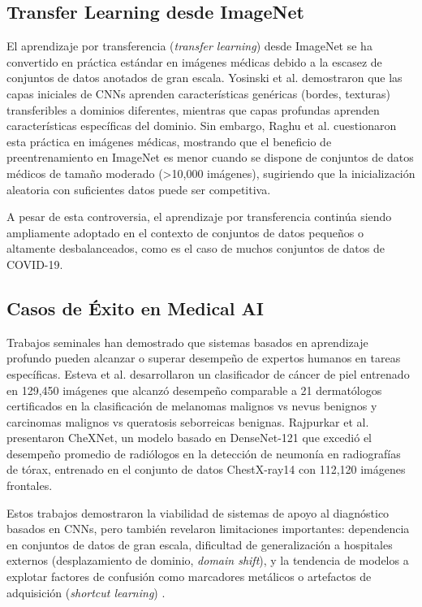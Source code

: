 \subsection{Transfer Learning desde ImageNet}

El aprendizaje por transferencia (\textit{transfer learning}) desde ImageNet \cite{deng2009imagenet} se ha convertido en práctica estándar en imágenes médicas debido a la escasez de conjuntos de datos anotados de gran escala. Yosinski et al. \cite{yosinski2014transferable} demostraron que las capas iniciales de CNNs aprenden características genéricas (bordes, texturas) transferibles a dominios diferentes, mientras que capas profundas aprenden características específicas del dominio. Sin embargo, Raghu et al. \cite{raghu2019transfusion} cuestionaron esta práctica en imágenes médicas, mostrando que el beneficio de preentrenamiento en ImageNet es menor cuando se dispone de conjuntos de datos médicos de tamaño moderado (\textgreater10,000 imágenes), sugiriendo que la inicialización aleatoria con suficientes datos puede ser competitiva.

A pesar de esta controversia, el aprendizaje por transferencia continúa siendo ampliamente adoptado en el contexto de conjuntos de datos pequeños o altamente desbalanceados, como es el caso de muchos conjuntos de datos de COVID-19.

\subsection{Casos de Éxito en Medical AI}

Trabajos seminales han demostrado que sistemas basados en aprendizaje profundo pueden alcanzar o superar desempeño de expertos humanos en tareas específicas. Esteva et al. \cite{esteva2017dermatologist} desarrollaron un clasificador de cáncer de piel entrenado en 129,450 imágenes que alcanzó desempeño comparable a 21 dermatólogos certificados en la clasificación de melanomas malignos vs nevus benignos y carcinomas malignos vs queratosis seborreicas benignas. Rajpurkar et al. \cite{rajpurkar2017chexnet} presentaron CheXNet, un modelo basado en DenseNet-121 que excedió el desempeño promedio de radiólogos en la detección de neumonía en radiografías de tórax, entrenado en el conjunto de datos ChestX-ray14 con 112,120 imágenes frontales.

Estos trabajos demostraron la viabilidad de sistemas de apoyo al diagnóstico basados en CNNs, pero también revelaron limitaciones importantes: dependencia en conjuntos de datos de gran escala, dificultad de generalización a hospitales externos (desplazamiento de dominio, \textit{domain shift}), y la tendencia de modelos a explotar factores de confusión como marcadores metálicos o artefactos de adquisición (\textit{shortcut learning}) \cite{geirhos2020shortcut}.

